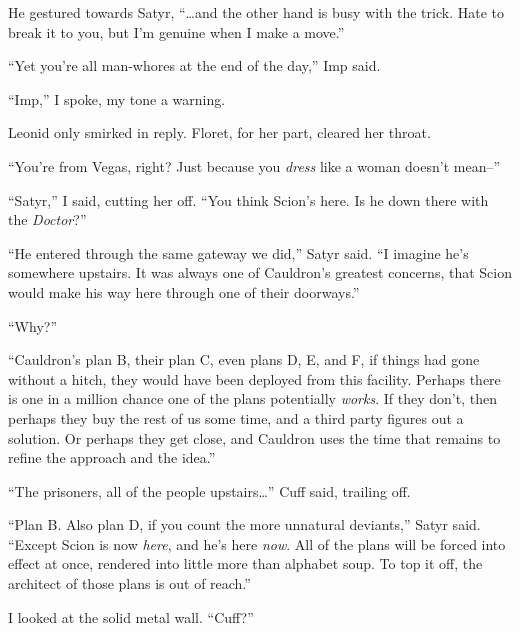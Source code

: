 He gestured towards Satyr, ``\ldots{}and the other hand is busy with the trick.  Hate to break it to you, but I'm genuine when I make a move.''



``Yet you're all man-whores at the end of the day,'' Imp said.



``Imp,'' I spoke, my tone a warning.



Leonid only smirked in reply.  Floret, for her part, cleared her throat.



``You're from Vegas, right?  Just because you \emph{dress} like a woman doesn't mean--''



``Satyr,'' I said, cutting her off.  ``You think Scion's here.  Is he down there with the \emph{Doctor}?''



``He entered through the same gateway we did,'' Satyr said.  ``I imagine he's somewhere upstairs.  It was always one of Cauldron's greatest concerns, that Scion would make his way here through one of their doorways.''



``Why?''



``Cauldron's plan B, their plan C, even plans D, E, and F, if things had gone without a hitch, they would have been deployed from this facility.  Perhaps there is one in a million chance one of the plans potentially \emph{works}.  If they don't, then perhaps they buy the rest of us some time, and a third party figures out a solution.  Or perhaps they get close, and Cauldron uses the time that remains to refine the approach and the idea.''



``The prisoners, all of the people upstairs\ldots'' Cuff said, trailing off.



``Plan B.  Also plan D, if you count the more unnatural deviants,'' Satyr said.  ``Except Scion is now \emph{here}, and he's here \emph{now}.  All of the plans will be forced into effect at once, rendered into little more than alphabet soup.  To top it off, the architect of those plans is out of reach.''



I looked at the solid metal wall.  ``Cuff?''




